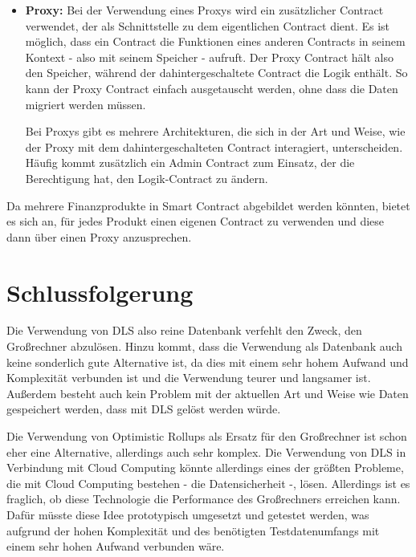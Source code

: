 \documentclass[12pt, a4paper]{article}
\newcommand{\footappendix}[2]{
      \footnote{
        #1 \hyperref[#2]{\nameref*{#2}, S. \pageref*{#2}}.
      }
    }
\begin{document}
{\begin{itemize}
    \item \textbf{Proxy:}
    Bei der Verwendung eines Proxys wird ein zusätzlicher Contract verwendet, der als Schnittstelle zu dem eigentlichen Contract dient.
    Es ist möglich, dass ein Contract die Funktionen eines anderen Contracts in seinem Kontext - also mit seinem Speicher - aufruft.
    Der Proxy Contract hält also den Speicher, während der dahintergeschaltete Contract die Logik enthält.
    So kann der Proxy Contract einfach ausgetauscht werden, ohne dass die Daten migriert werden müssen.

    \noindent
    Bei Proxys gibt es mehrere Architekturen, die sich in der Art und Weise, wie der Proxy mit dem dahintergeschalteten Contract interagiert, unterscheiden.
    Häufig kommt zusätzlich ein Admin Contract zum Einsatz, der die Berechtigung hat, den Logik-Contract zu ändern.
\end{itemize}

\noindent
Da mehrere Finanzprodukte in Smart Contract abgebildet werden könnten, bietet es sich an, für jedes Produkt einen eigenen Contract zu verwenden und diese dann über einen Proxy anzusprechen.
\noindent

\section{Schlussfolgerung}
\label{sec:Fazit}

Die Verwendung von DLS also reine Datenbank verfehlt den Zweck, den Großrechner abzulösen. 
Hinzu kommt, dass die Verwendung als Datenbank auch keine sonderlich gute Alternative ist, da dies mit einem sehr hohem Aufwand und Komplexität verbunden ist und die Verwendung teurer und langsamer ist.
Außerdem besteht auch kein Problem mit der aktuellen Art und Weise wie Daten gespeichert werden, dass mit DLS gelöst werden würde.

\noindent
Die Verwendung von Optimistic Rollups als Ersatz für den Großrechner ist schon eher eine Alternative, allerdings auch sehr komplex.
Die Verwendung von DLS in Verbindung mit Cloud Computing könnte allerdings eines der größten Probleme, die mit Cloud Computing bestehen - die Datensicherheit -, lösen.
Allerdings ist es fraglich, ob diese Technologie die Performance des Großrechners erreichen kann.
Dafür müsste diese Idee prototypisch umgesetzt und getestet werden, was aufgrund der hohen Komplexität und des benötigten Testdatenumfangs mit einem sehr hohen Aufwand verbunden wäre.

}
\end{document}
